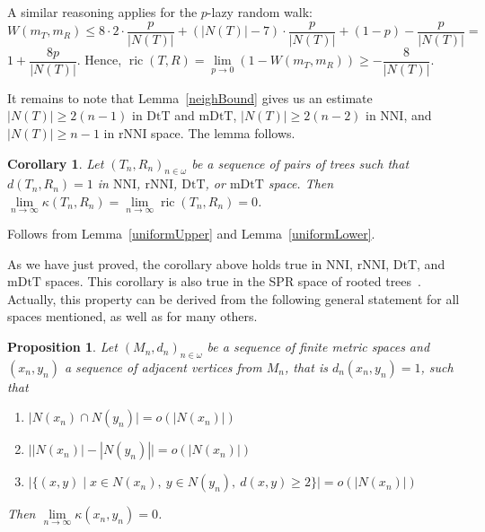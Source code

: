 \documentclass{amsart}
\newtheorem{proposition}[lemma]{Proposition}
\newtheorem{corollary}[lemma]{Corollary}
\newcommand{\dts}{\mathrm{DtT}}
\newcommand{\nni}{\mathrm{NNI}}
\newcommand{\rnni}{\mathrm{rNNI}}
\newcommand{\mdts}{\mathrm{mDtT}}
\newcommand{\ric}{\operatorname{ric}}
\begin{document}
A similar reasoning applies for the $p$-lazy random walk:
\[
W(m_T,m_R)\leq 8 \cdot 2 \cdot \frac{p}{|N(T)|} +
(|N(T)| - 7) \cdot \frac{p}{|N(T)|} + (1-p) - \frac{p}{|N(T)|} =
\]
$1 + \dfrac{8p}{|N(T)|}$. Hence,
$\ric(T,R) = \lim\limits_{p\to0}\left(1 - W(m_T,m_R)\right) \geq - \dfrac{8}{|N(T)|}$.

It remains to note that Lemma~\ref{neighBound} gives us an estimate $|N(T)| \geq 2(n-1)$ in $\dts$ and $\mdts$, $|N(T)| \geq 2(n-2)$ in $\nni$, and $|N(T)| \geq n-1$ in $\rnni$ space.
The lemma follows.
\endproof

\begin{corollary}\label{flatInLimDTS}
Let $(T_n,R_n)_{n\in\omega}$ be a sequence of pairs of trees such that
$d(T_n,R_n) = 1$ in $\nni$, $\rnni$, $\dts$, or $\mdts$ space.
Then $\lim\limits_{n \to \infty}\kappa(T_n,R_n) = \lim\limits_{n \to \infty}\ric(T_n,R_n) = 0$.
\end{corollary}

\proof
Follows from Lemma~\ref{uniformUpper} and Lemma~\ref{uniformLower}.
\endproof

As we have just proved, the corollary above holds true in $\nni$, $\rnni$, $\dts$, and $\mdts$ spaces.
This corollary is also true in the SPR space of rooted trees~\cite{Whidden2015-es}.
Actually, this property can be derived from the following general statement for all spaces mentioned, as well as for many others.

\begin{proposition}\label{flatInLimGen}
Let $(M_n,d_n)_{n \in \omega}$ be a sequence of finite metric spaces and
$(x_n, y_n)$ a sequence of adjacent vertices from $M_n$,
that is $d_n(x_n,y_n) = 1$, such that
\begin{enumerate}[(1)]
\item\label{intersec} $\big|N(x_n) \cap N(y_n)\big| = o(|N(x_n)|)$
\item\label{difference} $\big||N(x_n)| - |N(y_n)|\big| = o(|N(x_n)|)$
\item\label{dist2} $\big|\{(x,y) \mid
	x \in N(x_n),~ y \in N(y_n),~ d(x, y) \geq 2\}\big| = o(|N(x_n)|)$
\end{enumerate}

Then $\lim\limits_{n \to \infty} \kappa(x_n, y_n) = 0$.
\end{proposition}
\end{document}
